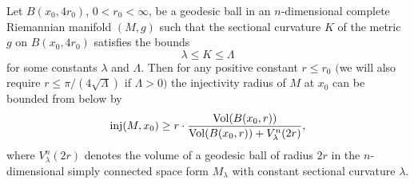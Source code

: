 \begin{theorem}
  \label{thm:cz-local-injectivity-radius-estimate-from-volume-and-curvature}
Let $B(x_0, 4r_0)$, $0<r_0<\infty$, be a geodesic ball in an
$n$-dimensional complete Riemannian manifold $(M,g)$ such that the
sectional curvature $K$ of the metric $g$ on $B(x_0,4r_0)$
satisfies the bounds
$$
\lambda\leq K\leq\Lambda
$$
for some constants $\lambda$ and $\Lambda$. Then for any positive
constant $r\le r_0$ $($we will also require $r\le
\pi/(4\sqrt{\Lambda})$ if $\Lambda>0)$ the injectivity radius of
$M$ at $x_0$ can be bounded from below by
$$
\mbox{\rm inj}(M, x_0)\geq r\cdot\frac{\operatorname{Vol}(B(x_0,
r))}{\operatorname{Vol}(B(x_0,r))+V^n_{\lambda}(2r)},
$$
where $V_{\lambda}^n(2r)$ denotes the volume of a geodesic ball of
radius $2r$ in the $n$-dimensional simply connected space form
$M_{\lambda}$ with constant sectional curvature $\lambda$.
\end{theorem}

